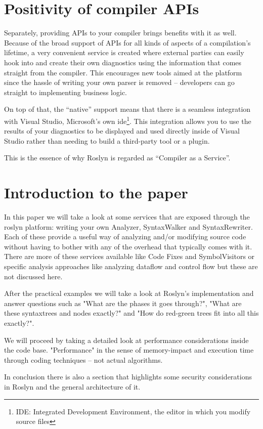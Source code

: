 \section{Positivity of compiler APIs}
\label{sec:intro-pos-api}

Separately, providing APIs to your compiler brings benefits with it as well. Because of the broad support of APIs for all kinds of aspects of a compilation’s lifetime, a very convenient service is created where external parties can easily hook into and create their own diagnostics using the information that comes straight from the \gls{compiler}. This encourages new tools aimed at the platform since the hassle of writing your own parser is removed – developers can go straight to implementing business logic. 

On top of that, the “native” support means that there is a seamless integration with Visual Studio, Microsoft’s own \gls{ide}\footnote{IDE: Integrated Development Environment, the editor in which you modify source files}. This integration allows you to use the results of your diagnostics to be displayed and used directly inside of Visual Studio rather than needing to build a third-party tool or a plugin.

\noindent This is the essence of why Roslyn is regarded as “Compiler as a Service”.



\section{Introduction to the paper}
\label{sec-intro-paper}

In this paper we will take a look at some services that are exposed through the roslyn platform: writing your own Analyzer, SyntaxWalker and SyntaxRewriter. Each of these provide a useful way of analyzing and/or modifying source code without having to bother with any of the overhead that typically comes with it. There are more of these services available like Code Fixes and SymbolVisitors or specific analysis approaches like analyzing \gls{dataflow} and control flow but these are not discussed here.

After the practical examples we will take a look at Roslyn's implementation and answer questions such as "What are the phases it goes through?", "What are these \glspl{syntaxtree} and nodes exactly?" and "How do red-green trees fit into all this exactly?".

We will proceed by taking a detailed look at performance considerations inside the code base. "Performance" in the sense of memory-impact and execution time through coding techniques -- not actual algorithms.

In conclusion there is also a section that highlights some security considerations in Roslyn and the general architecture of it.